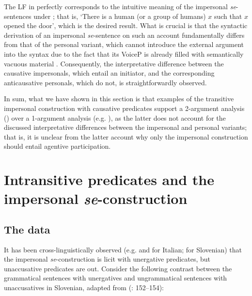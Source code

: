 \documentclass[output=paper,
modfonts,nonflat,
newtxmath
]{langsci/langscibook}
\begin{document}
\noindent The LF in  perfectly corresponds to the intuitive meaning of the impersonal \textit{se}-sentences under ; that is, `There is a human (or a group of humans) $x$ such that $x$ opened the door', which is the desired result. What is crucial is that the syntactic derivation of an impersonal \textit{se}-sentence on such an account fundamentally differs from that of the personal variant, which cannot introduce the external argument into the syntax due to the fact that its VoiceP  is already filled with semantically vacuous material . Consequently, the interpretative difference between the causative impersonals, which entail an initiator, and the corresponding anticausative personals, which do not, is straightforwardly observed. \par 

In sum, what we have shown in this section is that examples of the transitive impersonal construction with causative predicates support a 2-argument analysis (\citealt{riverosheppard2003}) over a 1-argument analysis (e.g. \citealt{marelj2004,grahek2008}), as the latter does not account for the discussed interpretative differences between the impersonal and personal variants; that is, it is unclear from the latter account why only the impersonal construction should entail agentive participation.

\section{Intransitive predicates and the impersonal \textit{se}-construction} \label{sec3}

\subsection{The data}

It has been cross-linguistically observed (e.g. \citealt{cinque1995} and \citealt{dalessandro2008} for Italian; \citealt{ilcmarvin2016} for Slovenian) that the impersonal \textit{se}-construction is licit with unergative predicates, but unaccusative predicates are out. Consider the following contrast between the grammatical sentences with unergatives  and ungrammatical sentences with unaccusatives  in Slovenian, adapted from \citeauthor{ilcmarvin2016} (\citeyear{ilcmarvin2016}: 152–154):
\end{document}
